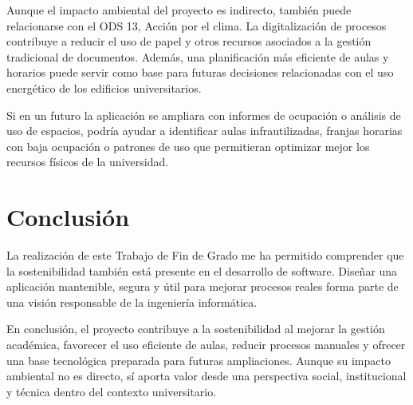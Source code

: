 Aunque el impacto ambiental del proyecto es indirecto, también puede relacionarse con el ODS 13, Acción por el clima. La digitalización de procesos contribuye a reducir el uso de papel y otros recursos asociados a la gestión tradicional de documentos. Además, una planificación más eficiente de aulas y horarios puede servir como base para futuras decisiones relacionadas con el uso energético de los edificios universitarios.

Si en un futuro la aplicación se ampliara con informes de ocupación o análisis de uso de espacios, podría ayudar a identificar aulas infrautilizadas, franjas horarias con baja ocupación o patrones de uso que permitieran optimizar mejor los recursos físicos de la universidad.

\section{Conclusión}

La realización de este Trabajo de Fin de Grado me ha permitido comprender que la sostenibilidad también está presente en el desarrollo de software. Diseñar una aplicación mantenible, segura y útil para mejorar procesos reales forma parte de una visión responsable de la ingeniería informática.

En conclusión, el proyecto contribuye a la sostenibilidad al mejorar la gestión académica, favorecer el uso eficiente de aulas, reducir procesos manuales y ofrecer una base tecnológica preparada para futuras ampliaciones. Aunque su impacto ambiental no es directo, sí aporta valor desde una perspectiva social, institucional y técnica dentro del contexto universitario.

